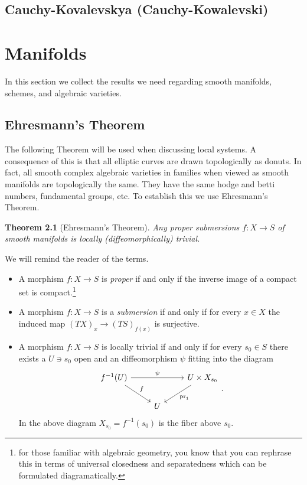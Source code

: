 \documentclass[12pt]{book}
\numberwithin{equation}{section}
\newtheorem{theorem}{Theorem}[subsection]
\theoremstyle{definition}
\theoremstyle{remark}
\newcommand{\pr}{\operatorname{pr}}
\begin{document}
\section{Cauchy-Kovalevskya (Cauchy-Kowalevski)}

\chapter[Spaces]{Manifolds}
In this section we collect the results we need regarding smooth manifolds, schemes, and algebraic varieties.
\section{Ehresmann's Theorem}
The following Theorem will be used when discussing local systems. 
A consequence of this is that all elliptic curves are drawn topologically as donuts. 
In fact, all smooth complex algebraic varieties in families when viewed as smooth manifolds are topologically the same. 
They have the same hodge and betti numbers, fundamental groups, etc. 
To establish this we use Ehresmann's Theorem.
\begin{theorem}[Ehresmann's Theorem]
	Any proper submersions $f:X\to S$ of smooth manifolds is locally (diffeomorphically) trivial. 
\end{theorem}
We will remind the reader of the terms.
\begin{itemize}
	\item A morphism $f:X\to S$ is \emph{proper} if and only if the inverse image of a compact set is compact.\footnote{for those familiar with algebraic geometry, you know that you can rephrase this in terms of universal closedness and separatedness which can be formulated diagramatically.}
	\item A morphism $f:X\to S$ is a \emph{submersion} if and only if for every $x\in X$ the induced map $(TX)_x \to (TS)_{f(x)}$ is surjective. 
	\item A morphism $f:X\to S$ is locally trivial if and only if for every $s_0 \in S$ there exists a $U \owns s_0$ open and an diffeomorphism $\psi$ fitting into the diagram
	$$\begin{tikzcd}
	f^{-1}(U) \ar[rr, "\psi"]\ar[dr, "f"]& & U \times X_{s_0} \ar[dl, "\pr_1"] \\
	& U & 
	\end{tikzcd}.$$	
	In the above diagram $X_{s_0} = f^{-1}(s_0)$ is the fiber above $s_0$.
\end{itemize}
\end{document}
